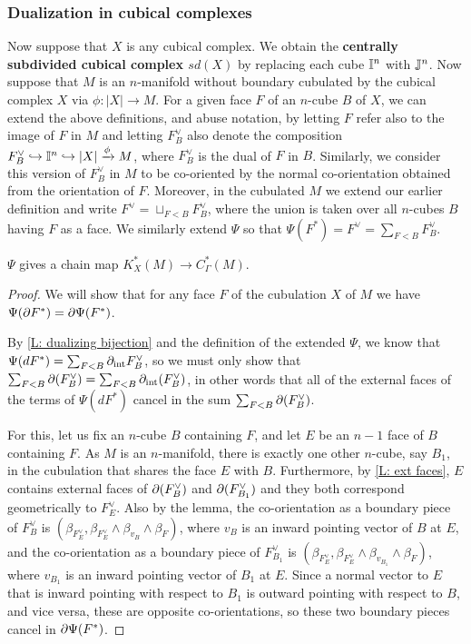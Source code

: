 \subsubsection{Dualization in cubical complexes}

Now suppose that $X$ is any cubical complex.
We obtain the \textbf{centrally subdivided cubical complex $sd(X)$} by replacing each cube $\mathbb{I}^n$ with $\mathbb{J}^n$.
Now suppose that $M$ is an $n$-manifold without boundary cubulated by the cubical complex $X$ via $\phi \colon |X| \to M$.
For a given face $F$ of an $n$-cube $B$ of $X$, we can extend the above definitions, and abuse notation, by letting $F$ refer also to the image of $F$ in $M$ and letting $F_B^\vee$ also denote the composition $F_B^\vee \hookrightarrow \mathbb{I}^n \hookrightarrow |X| \xrightarrow{\phi} M$, where $F_B^\vee$ is the dual of $F$ in $B$.
Similarly, we consider this version of $F_B^\vee$ in $M$ to be co-oriented by the normal co-orientation obtained from the orientation of $F$.
Moreover, in the cubulated $M$ we extend our earlier definition and write $F^\vee = \sqcup_{F<B} F^\vee_B$, where the union is taken over all $n$-cubes $B$ having $F$ as a face.
We similarly extend $\Psi$ so that $\Psi(F^*) = F^\vee = \sum_{F<B} F_{B}^\vee$.

\begin{lemma}\label{L: dual chain map}
	$\Psi$ gives a chain map $K_X^*(M) \to C_\Gamma^*(M)$.
\end{lemma}

\begin{proof}
	We will show that for any face $F$ of the cubulation $X$ of $M$ we have $\Psi(\partial F^*) = \partial\Psi(F^*)$.

	By \cref{L: dualizing bijection} and the definition of the extended $\Psi$, we know that $\Psi(dF^*) = \sum_{F<B} \partial_{\text{int}}F^\vee_B$, so we must only show that $\sum_{F<B} \partial (F^\vee_B) = \sum_{F<B} \partial_{\text{int}}(F^\vee_B)$, in other words that all of the external faces of the terms of $\Psi(dF^*)$ cancel in the sum $\sum_{F<B} \partial (F^\vee_B)$.

	For this, let us fix an $n$-cube $B$ containing $F$, and let $E$ be an $n-1$ face of $B$ containing $F$.
	As $M$ is an $n$-manifold, there is exactly one other $n$-cube, say $B_1$, in the cubulation that shares the face $E$ with $B$.
	Furthermore, by \cref{L: ext faces}, $E$ contains external faces of $\partial(F^\vee_B)$ and $\partial(F^\vee_{B_1})$ and they both correspond geometrically to $F^\vee_E$.
	Also by the lemma, the co-orientation as a boundary piece of $F^\vee_B$ is $(\beta_{F_E^\vee},\beta_{F_E^\vee} \wedge \beta_{v_B} \wedge \beta_F)$, where $v_B$ is an inward pointing vector of $B$ at $E$, and the co-orientation as a boundary piece of $F^\vee_{B_1}$ is $(\beta_{F_E^\vee},\beta_{F_E^\vee} \wedge \beta_{v_{B_1}} \wedge \beta_F)$, where $v_{B_1}$ is an inward pointing vector of $B_1$ at $E$.
	Since a normal vector to $E$ that is inward pointing with respect to $B_1$ is outward pointing with respect to $B$, and vice versa, these are opposite co-orientations, so these two boundary pieces cancel in $\partial \Psi(F^*)$.
\end{proof}

